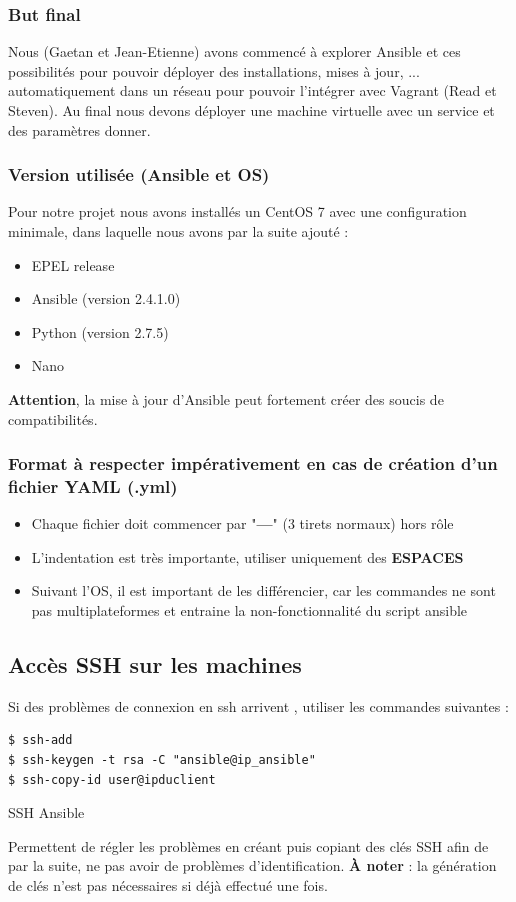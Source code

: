 \documentclass[a4paper, 12pt]{article}
\newenvironment{code}{\captionsetup{type=listing}}{}
\begin{document}
\subsubsection{But final}
Nous (Gaetan et Jean-Etienne) avons commencé à explorer Ansible et ces possibilités pour pouvoir
déployer des installations, mises à jour, ... automatiquement dans un réseau pour pouvoir l'intégrer
avec Vagrant (Read et Steven). Au final nous devons déployer une machine virtuelle avec un service et
des paramètres donner.

\subsubsection{Version utilisée (Ansible et OS)}
Pour notre projet nous avons installés un CentOS 7 avec une configuration minimale, dans laquelle nous avons par la suite ajouté :
\begin{itemize}
    \item EPEL release
    \item Ansible (version 2.4.1.0)
    \item Python (version 2.7.5)
    \item Nano
\end{itemize}
\textbf{Attention}, la mise à jour d'Ansible peut fortement créer des soucis de compatibilités.

\subsubsection{Format à respecter impérativement en cas de création d'un fichier YAML (.yml)}
\begin{itemize}
    \item Chaque fichier doit commencer par "\textbf{---}" (3 tirets normaux) hors rôle
    \item L'indentation est très importante, utiliser uniquement des \textbf{ESPACES}
    \item Suivant l'OS, il est important de les différencier, car les commandes ne sont pas multiplateformes et entraine la non-fonctionnalité du script ansible
\end{itemize}

\subsection{Accès SSH sur les machines}
Si des problèmes de connexion en ssh arrivent , utiliser les commandes suivantes :
\begin{code}
    \begin{verbatim}
$ ssh-add
$ ssh-keygen -t rsa -C "ansible@ip_ansible"
$ ssh-copy-id user@ipduclient
    \end{verbatim}
    \caption{SSH Ansible}
    \label{ssh_ansible}
\end{code}
\bigbreak
Permettent de régler les problèmes en créant puis copiant des clés SSH afin de par la suite, ne pas avoir de problèmes d'identification.
\textbf{À noter} : la génération de clés n'est pas nécessaires si déjà effectué une fois.
\end{document}
